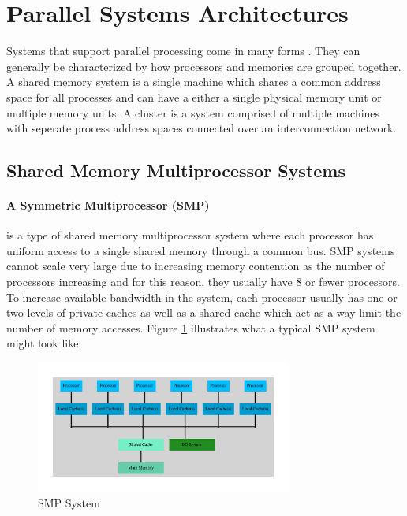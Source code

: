 \documentclass[11pt]{book}
\begin{document}
\section{Parallel Systems Architectures}

Systems that support parallel processing come in many forms \cite{culler-97,patterson-11}.
They can generally be characterized by how processors and memories are grouped together.
A shared memory system is a single machine which shares a common address space for all
processes and can have a either a single physical memory unit or multiple memory units.  A
cluster is a system comprised of multiple machines with seperate process address spaces
connected over an interconnection network.

\subsection{Shared Memory Multiprocessor Systems}

\paragraph{A Symmetric Multiprocessor (SMP)} is a type of shared memory multiprocessor
system where each processor has uniform access to a single shared memory through a common
bus.  SMP systems cannot scale very large due to increasing memory contention as the
number of processors increasing and for this reason, they usually have 8 or fewer
processors.  To increase available bandwidth in the system, each processor usually has one
or two levels of private caches as well as a shared cache which act as a way limit the
number of memory accesses.  Figure \ref{smp} illustrates what a typical SMP system might
look like.

\begin{figure}
  \centering
  \includegraphics[width=0.75\textwidth,quiet]{figs/graphviz/smp.pdf}
  \caption{SMP System}\label{smp}
\end{figure}
\end{document}
